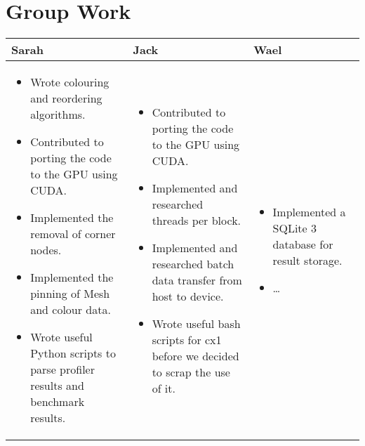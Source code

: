 \section*{Group Work}
\begin{tabular}{|p{5.5cm}| p{5.5cm} | p{5.5cm} |}
  \hline
  Sarah & Jack & Wael\\
  \hline
  \hline
  \begin{itemize}
    \item Wrote colouring and reordering algorithms.
    \item Contributed to porting the code to the GPU using CUDA.
    \item Implemented the removal of corner nodes.
    \item Implemented the pinning of Mesh and colour data.
    \item Wrote useful Python scripts to parse profiler results and benchmark results.
  \end{itemize} &

  \begin{itemize}
    \item Contributed to porting the code to the GPU using CUDA.
    \item Implemented and researched threads per block.
    \item Implemented and researched batch data transfer from host to device.
    \item Wrote useful bash scripts for cx1 before we decided to scrap the use of it.
  \end{itemize} &

  \begin{itemize}
    \item Implemented a SQLite 3 database for result storage.
    \item \ldots
  \end{itemize} \\
  \hline
\end{tabular}

